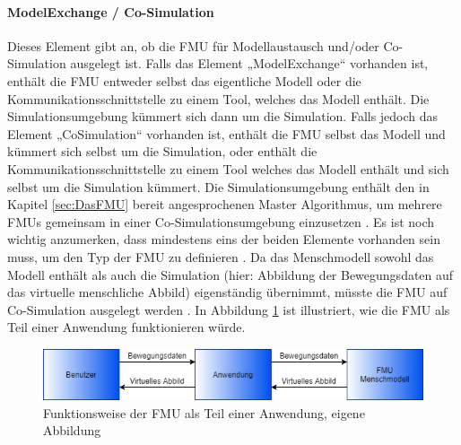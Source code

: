 \paragraph{ModelExchange / Co-Simulation}\label{sec:ModellExchangeCoSimulation}
\noindent Dieses Element gibt an, ob die FMU für Modellaustausch und/oder Co-Simulation ausgelegt ist.
Falls das Element „ModelExchange“ vorhanden ist, enthält die FMU entweder selbst das eigentliche Modell oder die Kommunikationsschnittstelle zu einem Tool, welches das Modell enthält. Die Simulationsumgebung kümmert sich dann um die Simulation.
Falls jedoch das Element „CoSimulation“ vorhanden ist, enthält die FMU selbst das Modell und kümmert sich selbst um die Simulation, oder enthält die Kommunikationsschnittstelle zu einem Tool welches das Modell enthält und sich selbst um die Simulation kümmert. Die Simulationsumgebung enthält den in Kapitel \ref*{sec:DasFMU} bereit angesprochenen Master Algorithmus, um mehrere FMUs gemeinsam in einer Co-Simulationsumgebung einzusetzen \cite[S.30]{25}.
Es ist noch wichtig anzumerken, dass mindestens eins der beiden Elemente vorhanden sein muss, um den Typ der FMU zu definieren \cite[S.31]{25}.
Da das Menschmodell sowohl das Modell enthält als auch die Simulation (hier: Abbildung der Bewegungsdaten auf das virtuelle menschliche Abbild) eigenständig übernimmt, müsste die FMU auf Co-Simulation ausgelegt werden \cite[S.30]{25}.
\newline
In Abbildung \ref{fig:FMUCoSimulation} ist illustriert, wie die FMU als Teil einer Anwendung funktionieren würde.
\begin{figure}[h]
	\centering
	\includegraphics[width=1\linewidth]{Bilder/A23_FMUCoSimulation}
	\caption{Funktionsweise der FMU als Teil einer Anwendung, eigene Abbildung}
	\label{fig:FMUCoSimulation}
\end{figure}

